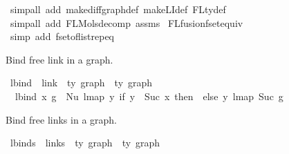 \begin{isabellebody}
%
\isadelimproof
%
\endisadelimproof
%
\isatagproof
{}\isamarkupfalse%
\ {\isacharparenleft}{\kern0pt}simp{\isacharunderscore}{\kern0pt}all\ add{\isacharcolon}{\kern0pt}\ make{\isacharunderscore}{\kern0pt}diffgraph{\isacharunderscore}{\kern0pt}def\ make{\isacharunderscore}{\kern0pt}LI{\isacharunderscore}{\kern0pt}def\ FLty{\isacharunderscore}{\kern0pt}def{\isacharparenright}{\kern0pt}\isanewline
{}\isamarkupfalse%
\ {\isacharparenleft}{\kern0pt}simp{\isacharunderscore}{\kern0pt}all\ add{\isacharcolon}{\kern0pt}\ FL{\isacharunderscore}{\kern0pt}Mols{}{\isacharunderscore}{\kern0pt}decomp\ assms{\isacharparenright}{\kern0pt}\isanewline
{}\isamarkupfalse%
\ FLfusion{\isacharunderscore}{\kern0pt}fset{\isacharunderscore}{\kern0pt}equiv\isanewline
{}\isamarkupfalse%
\ {\isacharparenleft}{\kern0pt}simp\ add{\isacharcolon}{\kern0pt}\ fset{\isacharunderscore}{\kern0pt}of{\isacharunderscore}{\kern0pt}list{\isachardot}{\kern0pt}rep{\isacharunderscore}{\kern0pt}eq{\isacharparenright}{\kern0pt}%
\endisatagproof
{\isafoldproof}%
%
\isadelimproof
%
\endisadelimproof
%
\begin{isamarkuptext}%
Bind free link in a graph.%
\end{isamarkuptext}\isamarkuptrue%
\isamarkupfalse%
\ lbind\ {\isacharcolon}{\kern0pt}{\isacharcolon}{\kern0pt}\ {\isachardoublequoteopen}link\ {\isacharequal}{\kern0pt}{\isachargreater}{\kern0pt}\ {\isacharprime}{\kern0pt}ty\ graph\ {\isacharequal}{\kern0pt}{\isachargreater}{\kern0pt}\ {\isacharprime}{\kern0pt}ty\ graph{\isachardoublequoteclose}\ \isanewline
\ \ {\isachardoublequoteopen}lbind\ x\ g\ {\isacharequal}{\kern0pt}\ Nu\ {\isacharparenleft}{\kern0pt}{\isacharparenleft}{\kern0pt}lmap\ {\isacharparenleft}{\kern0pt}{\isasymlambda}y{\isachardot}{\kern0pt}\ if\ y\ {\isacharequal}{\kern0pt}\ Suc\ x\ then\ {}\ else\ y{\isacharparenright}{\kern0pt}{\isacharparenright}{\kern0pt}\ {\isacharparenleft}{\kern0pt}lmap\ Suc\ g{\isacharparenright}{\kern0pt}{\isacharparenright}{\kern0pt}{\isachardoublequoteclose}%
\begin{isamarkuptext}%
Bind free links in a graph.%
\end{isamarkuptext}\isamarkuptrue%
\isamarkupfalse%
\ lbinds\ {\isacharcolon}{\kern0pt}{\isacharcolon}{\kern0pt}\ {\isachardoublequoteopen}links\ {\isacharequal}{\kern0pt}{\isachargreater}{\kern0pt}\ {\isacharprime}{\kern0pt}ty\ graph\ {\isacharequal}{\kern0pt}{\isachargreater}{\kern0pt}\ {\isacharprime}{\kern0pt}ty\ graph{\isachardoublequoteclose}\ \isanewline

\end{isabellebody}
